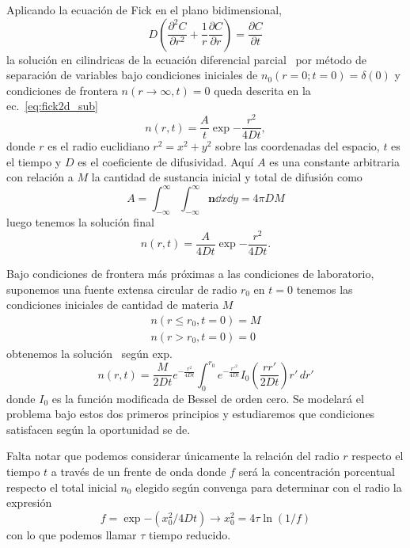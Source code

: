 \documentclass[11pt]{article}
\begin{document}
Aplicando la ecuación de Fick en el plano bidimensional,
\begin{equation}
    D \left( \frac{\partial^2 C}{\partial r^2} + \frac{1}{r} \frac{\partial C}{\partial r} \right) = \frac{\partial C}{\partial t}
\end{equation}
la solución en cilindricas de la ecuación diferencial parcial~\cite{gilExperimentosFisicaUsando2014} por método de separación de variables bajo condiciones iniciales de $n_0(r=0; t=0) = \delta(0)$ y condiciones de frontera $n(r \to \infty, t) = 0$ queda descrita en la ec.~\eqref{eq:fick2d_sub}\
\begin{equation}
    n(r,t) = \frac{A}{t} \exp{-\frac{r^2}{4Dt}},
    \label{eq:fick2d_sub}
\end{equation}
donde $r$ es el radio euclidiano $r^2 = x^2 + y^2$ sobre las coordenadas del espacio, $t$ es el tiempo y $D$ es el coeficiente de difusividad. Aquí $A$ es una constante arbitraria con relación a $M$ la cantidad de sustancia inicial y total de difusión como
\begin{equation}
    A = \int_{-\infty}^\infty \int_{-\infty}^\infty \mathbf{n} \dd{x}\dd{y} = 4 \pi D M
\end{equation}
luego tenemos la solución final
\begin{equation}
    n(r,t) = \frac{A}{4 D t} \exp{-\frac{r^2}{4Dt}}.
    \label{eq:fick2d}
\end{equation}

Bajo condiciones de frontera más próximas a las condiciones de laboratorio, suponemos una fuente extensa circular de radio $r_0$ en $t=0$ tenemos las condiciones iniciales de cantidad de materia $M$
\begin{subequations}
\begin{align}
    n(r \leq r_0, t=0) = M\\
    n(r > r_0, t=0) = 0
\end{align}
\end{subequations}
obtenemos la solución~\cite{crankMathematicsDiffusion1976} según exp. 
\begin{equation} \label{eq:diffusion2d_round}
    n(r,t) = \frac{M}{2Dt} e^{-\frac{r^2}{4Dt}} \int_{0}^{r_0} e^{-\frac{r'^2}{4Dt}} I_0 \left( \frac{rr'}{2Dt} \right) r' \, dr'
\end{equation}
donde $I_0$ es la función modificada de Bessel de orden cero. Se modelará el problema bajo estos dos primeros principios y estudiaremos que condiciones satisfacen según la oportunidad se de.

Falta notar que podemos considerar únicamente la relación del radio $r$ respecto el tiempo $t$ a través de un frente de onda donde $f$ será la concentración porcentual respecto el total inicial $n_0$ elegido según convenga para determinar con el radio la expresión
\begin{equation}
    f = \exp{-(x^2_0/4Dt)} \to x_0^2 = 4 \tau \ln(1/f)
\end{equation}
con lo que podemos llamar $\tau$ tiempo reducido.
\end{document}

